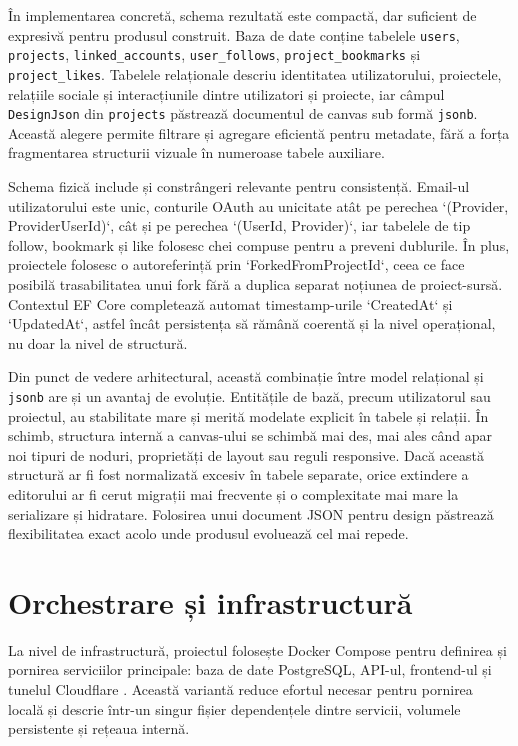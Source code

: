 În implementarea concretă, schema rezultată este compactă, dar suficient de expresivă pentru produsul construit. Baza de date conține tabelele \texttt{users}, \texttt{projects}, \texttt{linked\_accounts}, \texttt{user\_follows}, \texttt{project\_bookmarks} și \texttt{project\_likes}. Tabelele relaționale descriu identitatea utilizatorului, proiectele, relațiile sociale și interacțiunile dintre utilizatori și proiecte, iar câmpul \texttt{DesignJson} din \texttt{projects} păstrează documentul de canvas sub formă \texttt{jsonb}. Această alegere permite filtrare și agregare eficientă pentru metadate, fără a forța fragmentarea structurii vizuale în numeroase tabele auxiliare.

Schema fizică include și constrângeri relevante pentru consistență. Email-ul utilizatorului este unic, conturile OAuth au unicitate atât pe perechea `(Provider, ProviderUserId)`, cât și pe perechea `(UserId, Provider)`, iar tabelele de tip follow, bookmark și like folosesc chei compuse pentru a preveni dublurile. În plus, proiectele folosesc o autoreferință prin `ForkedFromProjectId`, ceea ce face posibilă trasabilitatea unui fork fără a duplica separat noțiunea de proiect-sursă. Contextul EF Core completează automat timestamp-urile `CreatedAt` și `UpdatedAt`, astfel încât persistența să rămână coerentă și la nivel operațional, nu doar la nivel de structură.

Din punct de vedere arhitectural, această combinație între model relațional și \texttt{jsonb} are și un avantaj de evoluție. Entitățile de bază, precum utilizatorul sau proiectul, au stabilitate mare și merită modelate explicit în tabele și relații. În schimb, structura internă a canvas-ului se schimbă mai des, mai ales când apar noi tipuri de noduri, proprietăți de layout sau reguli responsive. Dacă această structură ar fi fost normalizată excesiv în tabele separate, orice extindere a editorului ar fi cerut migrații mai frecvente și o complexitate mai mare la serializare și hidratare. Folosirea unui document JSON pentru design păstrează flexibilitatea exact acolo unde produsul evoluează cel mai repede.

\section{Orchestrare și infrastructură}

La nivel de infrastructură, proiectul folosește Docker Compose pentru definirea și pornirea serviciilor principale: baza de date PostgreSQL, API-ul, frontend-ul și tunelul Cloudflare \cite{dockerCompose2026,dockerComposeFile2026}. Această variantă reduce efortul necesar pentru pornirea locală și descrie într-un singur fișier dependențele dintre servicii, volumele persistente și rețeaua internă.

